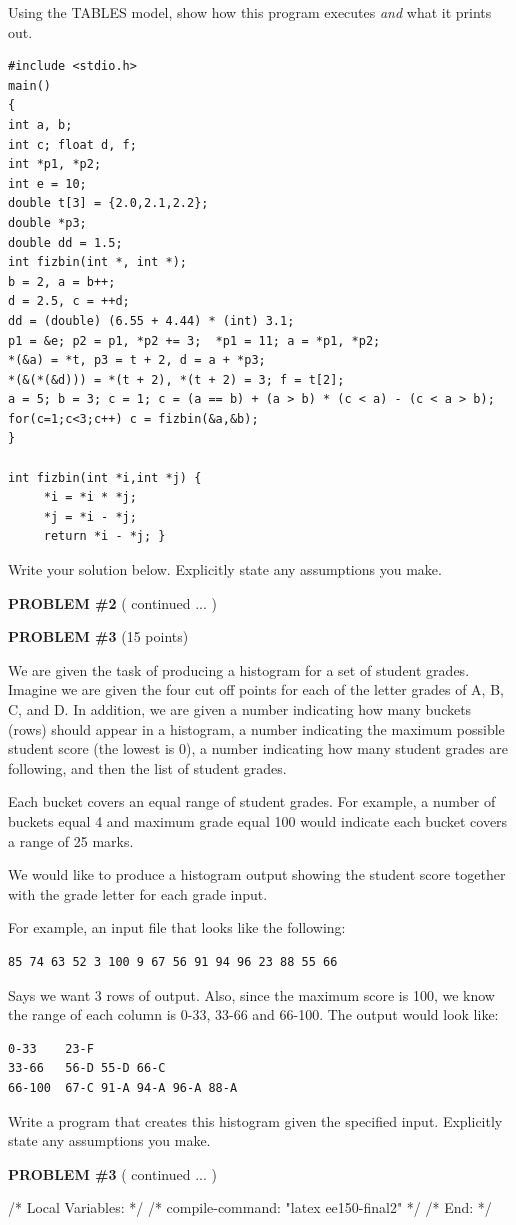 Using the TABLES model, show how this program executes {\em and} what 
it prints out.

\begin{verbatim}
#include <stdio.h>
main()
{
int a, b;
int c; float d, f;
int *p1, *p2;  
int e = 10; 
double t[3] = {2.0,2.1,2.2};
double *p3;
double dd = 1.5;
int fizbin(int *, int *);
b = 2, a = b++;
d = 2.5, c = ++d;
dd = (double) (6.55 + 4.44) * (int) 3.1;
p1 = &e; p2 = p1, *p2 += 3;  *p1 = 11; a = *p1, *p2;  
*(&a) = *t, p3 = t + 2, d = a + *p3;
*(&(*(&d))) = *(t + 2), *(t + 2) = 3; f = t[2];
a = 5; b = 3; c = 1; c = (a == b) + (a > b) * (c < a) - (c < a > b);
for(c=1;c<3;c++) c = fizbin(&a,&b);
}

int fizbin(int *i,int *j) {
     *i = *i * *j;
     *j = *i - *j;
     return *i - *j; }
\end{verbatim}

Write your solution below.  Explicitly state any assumptions you make.

\pagebreak
{\bf PROBLEM \#2} ( continued ... )

\pagebreak
{\bf PROBLEM \#3} (15 points)

We are given the task of producing a histogram for a set of student
grades.  Imagine we are given the four cut off points for each of the
letter grades of A, B, C, and D.  In addition, we are given a number
indicating how many buckets (rows) should appear in a histogram, a
number indicating the maximum possible student score (the lowest is
0),  a number indicating how many student grades are following, and
then the list of student grades.

Each bucket covers an equal range of student grades.  For example, a
number of buckets equal 4 and maximum grade equal 100 would indicate
each bucket covers a range of 25 marks.

We would like to produce a histogram output showing the student score
together with the grade letter for each grade input. 

For example, an input file that looks like the following:
\begin{verbatim}
85 74 63 52 3 100 9 67 56 91 94 96 23 88 55 66
\end{verbatim}

Says we want 3 rows of output. Also, since the maximum score is 100, we know
the range of each column is 0-33, 33-66 and 66-100. The output would look like:
\begin{verbatim} 
0-33    23-F
33-66   56-D 55-D 66-C
66-100  67-C 91-A 94-A 96-A 88-A 
\end{verbatim}

Write a program that creates this histogram given the specified input.
Explicitly state any assumptions you make.

\pagebreak
{\bf PROBLEM \#3} ( continued ... )




/* Local Variables: */
/* compile-command: "latex ee150-final2" */
/* End: */